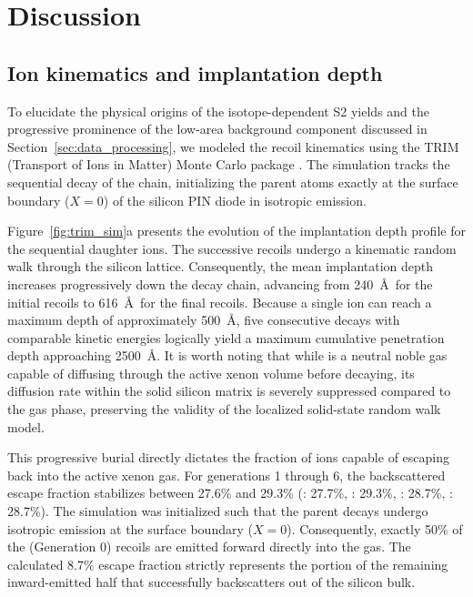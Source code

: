 \section{Discussion}
\label{sec:discussion}

\subsection{Ion kinematics and implantation depth}

To elucidate the physical origins of the isotope-dependent S2 yields and the progressive prominence
of the low-area background component discussed in Section~\ref{sec:data_processing}, we modeled the
recoil kinematics using the TRIM (Transport of Ions in Matter) Monte Carlo package
\cite{ziegler_srim_2010}. The simulation tracks the sequential decay of the 
chain, initializing the parent atoms exactly at the surface boundary ($X=0$) of the silicon PIN
diode in isotropic emission.

Figure~\ref{fig:trim_sim}a presents the evolution of the implantation depth profile for the
sequential daughter ions. The successive recoils undergo a kinematic random walk through the
silicon lattice. Consequently, the mean implantation depth increases progressively down the decay
chain, advancing from 240~\AA\ for the initial  recoils to 616~\AA\ for the final
 recoils. Because a single  ion can reach a maximum depth of
approximately 500~\AA, five consecutive decays with comparable kinetic energies logically yield a
maximum cumulative penetration depth approaching 2500~\AA. It is worth noting that while
 is a neutral noble gas capable of diffusing through the active xenon volume
before decaying, its diffusion rate within the solid silicon matrix is severely suppressed compared
to the gas phase, preserving the validity of the localized solid-state random walk model.

This progressive burial directly dictates the fraction of ions capable of escaping back into the
active xenon gas. For generations 1 through 6, the backscattered escape fraction stabilizes between
27.6\% and 29.3\% (: 27.7\%, : 29.3\%, : 28.7\%,
: 28.7\%). The simulation was initialized such that the  parent
decays undergo isotropic emission at the surface boundary ($X=0$). Consequently, exactly 50\% of
the  (Generation 0) recoils are emitted forward directly into the gas. The
calculated 8.7\% escape fraction strictly represents the portion of the remaining inward-emitted
half that successfully backscatters out of the silicon bulk.

